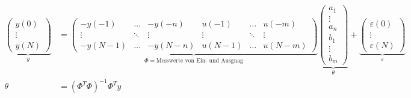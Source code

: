 \begin{align*}
	\underbrace{\begin{pmatrix}
		y(0)\\
		\vdots\\
		y(N)
	\end{pmatrix}}_y
			&= \underbrace{\begin{pmatrix}
					-y(-1) 	&\ldots 	&-y(-n) 	& u(-1)   	&\ldots 	& u(-m)\\
					\vdots	&\ddots		&\vdots		&\vdots		&\ddots		&\vdots\\	
					-y(N-1) &\ldots 	&-y(N-n) 	& u(N-1) 	&\ldots 	& u(N-m)
					\end{pmatrix}}_{\Phi = \text{Messwerte von Ein- und Ausgnag}}
				\underbrace{\begin{pmatrix}
					a_1\\ 
					\vdots \\
					a_n\\
					b_1\\
					\vdots\\
					b_m
				\end{pmatrix}}_\theta+
				\underbrace{\begin{pmatrix}
					\varepsilon(0)\\
					\vdots\\
					\varepsilon(N)
				\end{pmatrix}}_\varepsilon\\
	\theta	&= \left(\Phi^T\Phi\right)^{-1}\Phi^Ty
\end{align*}
\newpage